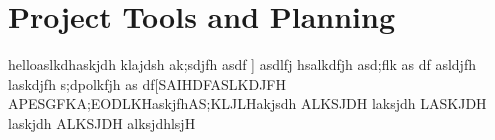 
\chapter{Project Tools and Planning}
\label{planning}
helloaslkdhaskjdh klajdsh ak;sdjfh asdf
] asdlfj hsalkdfjh asd;flk as
df asldjfh laskdjfh s;dpolkfjh as
df[SAIHDFASLKDJFH APESGFKA;EODLKHaskjfhAS;KLJLHakjsdh ALKSJDH laksjdh LASKJDH laskjdh ALKSJDH alksjdhlsjH
